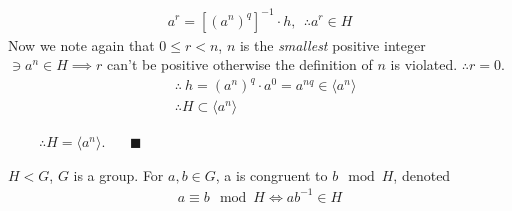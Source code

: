 \begin{proposition}
\begin{enumerate}
\begin{align}
        a^r=[(a^n)^q]^{-1}\cdot h, \ \ \therefore a^r\in H \nonumber
    \end{align}
    Now we note again that $0\leq r < n$, $n$ is the \textit{smallest} positive integer $\ni a^n\in H \implies r$ can't be positive otherwise the definition of $n$ is violated. $\therefore r=0$.
    \begin{align}
        &\therefore \ h= (a^n)^q\cdot a^0 = a^{nq}\in \langle a^n \rangle \nonumber \\
        &\therefore H\subset \langle a^n \rangle \nonumber
    \end{align}
\end{enumerate}
\indent $\ \ \ \ \ \ \ \ \ \ \therefore H=\langle a^n \rangle.  \ \ \ \ \ \ \ \ \blacksquare$
\end{proposition}

\begin{definition}
$H<G$, $G$ is a group. For $a,b\in G$, a is congruent to $b\mod H$, denoted
\begin{align}
    a\equiv b \mod H \iff ab^{-1}\in H \nonumber
    \end{align}
\end{definition}

